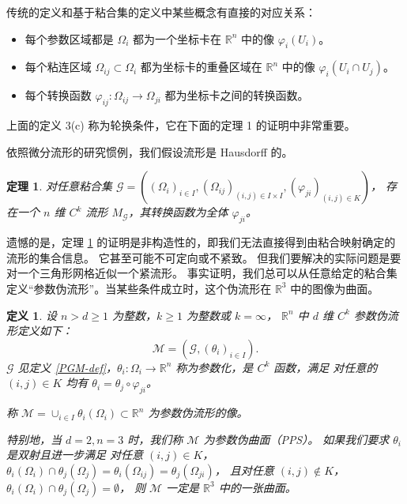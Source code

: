 \documentclass{ctexart}
\newtheorem{Thm}{定理}
\newtheorem{Def}{定义}
\begin{document}
	传统的定义和基于粘合集的定义中某些概念有直接的对应关系：

	\begin{itemize}
		\item 每个参数区域都是 $\Omega_i$ 都为一个坐标卡在 $\mathbb{R}^n$ 中的像 $\varphi_i(U_i)$。
		\item 每个粘连区域 $\Omega_{ij}\subset \Omega_i$ 都为坐标卡的重叠区域在 $\mathbb{R}^n$ 中的像 $\varphi_i(U_i\cap U_j)$。
		\item 每个转换函数 $\varphi_{ij}:\Omega_{ij}\rightarrow \Omega_{ji}$ 都为坐标卡之间的转换函数。
	\end{itemize}

	上面的定义 3(c) 称为轮换条件，它在下面的定理 1 的证明中非常重要。

	依照微分流形的研究惯例，我们假设流形是 Hausdorff 的。

	\begin{Thm}\label{PGM-thm}
		对任意粘合集 $\mathcal{G} = ((\Omega_i)_{i\in I},(\Omega_{ij})_{(i,j)\in I\times I},(\varphi_{ji})_{(i,j)\in K})$，
		存在一个 $n$ 维 $C^k$ 流形 $M_\mathcal{G}$，其转换函数为全体 $\varphi_{ji}$。
	\end{Thm}

	遗憾的是，定理 \ref{PGM-thm} 的证明是非构造性的，即我们无法直接得到由粘合映射确定的流形的集合信息。
	它甚至可能不可定向或不紧致。
	但我们要解决的实际问题是要对一个三角形网格近似一个紧流形。
	事实证明，我们总可以从任意给定的粘合集定义“参数伪流形”。当某些条件成立时，这个伪流形在 $\mathbb{R}^3$ 中的图像为曲面。

	\begin{Def}\label{PPM-def}
		设 $n>d\geq 1$ 为整数，$k\geq 1$ 为整数或 $k=\infty$，
		$\mathbb{R}^n$ 中 $d$ 维 $C^k$ 参数伪流形定义如下：
		\begin{equation}
			\mathcal{M}=(\mathcal{G},(\theta_i)_{i\in I}).
		\end{equation}
		$\mathcal{G}$ 见定义 \ref{PGM-def}，$\theta_i:\Omega_i\rightarrow \mathbb{R}^n$ 称为参数化，是 $C^k$ 函数，满足
		对任意的 $(i,j)\in K$ 均有 $\theta_i=\theta_j\circ \varphi_{ji}$。

		称 $\mathcal{M}=\cup_{i\in I}\theta_i(\Omega_i) \subset \mathbb{R}^n$ 为参数伪流形的像。

		特别地，当 $d=2,n=3$ 时，我们称 $\mathcal{M}$ 为参数伪曲面（PPS）。
		如果我们要求 $\theta_i$ 是双射且进一步满足
		对任意 $(i,j)\in K$，$\theta_i(\Omega_i)\cap \theta_j(\Omega_j) = \theta_i(\Omega_{ij}) = \theta_j(\Omega_{ji})$，
		且对任意 $(i,j)\notin K$， $\theta_i(\Omega_i)\cap \theta_j(\Omega_j) = \emptyset$，
		则 $\mathcal{M}$ 一定是 $\mathbb{R}^3$ 中的一张曲面。
	\end{Def}
\end{document}
